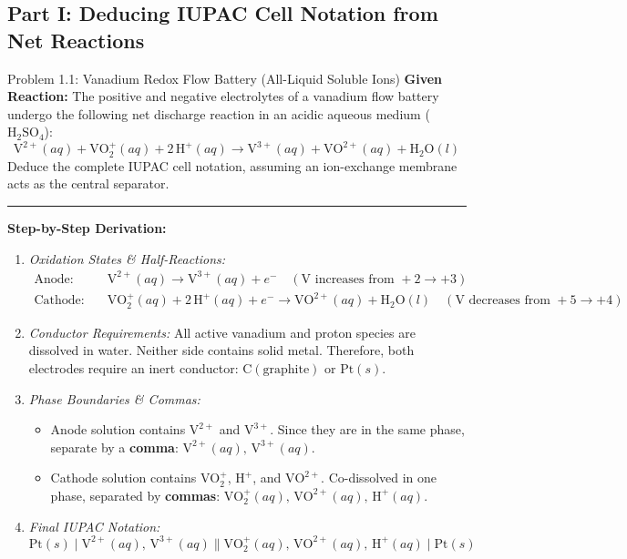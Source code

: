 \documentclass[10pt,a4paper]{article}
\begin{document}
\subsection{Part I: Deducing IUPAC Cell Notation from Net Reactions}

\begin{examplebox}{Problem 1.1: Vanadium Redox Flow Battery (All-Liquid Soluble Ions)}
\textbf{Given Reaction:}
The positive and negative electrolytes of a vanadium flow battery undergo the following net discharge reaction in an acidic aqueous medium ($\text{H}_2\text{SO}_4$):
\begin{equation*}
    \text{V}^{2+}(aq) + \text{VO}_2^+(aq) + 2\,\text{H}^+(aq) \longrightarrow \text{V}^{3+}(aq) + \text{VO}^{2+}(aq) + \text{H}_2\text{O}(l)
\end{equation*}
Deduce the complete IUPAC cell notation, assuming an ion-exchange membrane acts as the central separator.

\vspace{0.3cm}\hrule\vspace{0.3cm}
\textbf{Step-by-Step Derivation:}
\begin{enumerate}
    \item \textit{Oxidation States \& Half-Reactions:}
    \begin{align*}
        \text{Anode:} \quad & \text{V}^{2+}(aq) \longrightarrow \text{V}^{3+}(aq) + e^- \quad (\text{V increases from } +2 \rightarrow +3) \\
        \text{Cathode:} \quad & \text{VO}_2^+(aq) + 2\,\text{H}^+(aq) + e^- \longrightarrow \text{VO}^{2+}(aq) + \text{H}_2\text{O}(l) \quad (\text{V decreases from } +5 \rightarrow +4)
    \end{align*}
    \item \textit{Conductor Requirements:} All active vanadium and proton species are dissolved in water. Neither side contains solid metal. Therefore, both electrodes require an inert conductor: $\text{C}(\text{graphite})$ or $\text{Pt}(s)$.
    \item \textit{Phase Boundaries \& Commas:}
    \begin{itemize}
        \item Anode solution contains $\text{V}^{2+}$ and $\text{V}^{3+}$. Since they are in the same phase, separate by a \textbf{comma}: $\text{V}^{2+}(aq),\, \text{V}^{3+}(aq)$.
        \item Cathode solution contains $\text{VO}_2^+$, $\text{H}^+$, and $\text{VO}^{2+}$. Co-dissolved in one phase, separated by \textbf{commas}: $\text{VO}_2^+(aq),\, \text{VO}^{2+}(aq),\, \text{H}^+(aq)$.
    \end{itemize}
    \item \textit{Final IUPAC Notation:}
    $$\text{Pt}(s) \mid \text{V}^{2+}(aq),\, \text{V}^{3+}(aq) \parallel \text{VO}_2^+(aq),\, \text{VO}^{2+}(aq),\, \text{H}^+(aq) \mid \text{Pt}(s)$$
\end{enumerate}
\end{examplebox}
\end{document}
